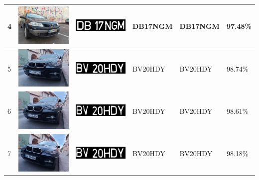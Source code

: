 \documentclass[a4paper,12pt]{report}
\begin{document}
\begin{longtable}{| m{0.6cm} | m{3cm} | m{3cm} | m{1.8cm} | m{1.8cm} | m{1.8cm} |}
    4   & \includegraphics[width=3cm,keepaspectratio]{dataset/1_s2.jpg}   & \includegraphics[width=3cm,keepaspectratio]{segmentari/4.jpg}   & DB17NGM             & DB17NGM              & 97.48\%    \\ \hline
    5   & \includegraphics[width=3cm,keepaspectratio]{dataset/2_d1.jpg}   & \includegraphics[width=3cm,keepaspectratio]{segmentari/5.jpg}   & BV20HDY             & BV20HDY              & 98.74\%    \\ \hline
    6   & \includegraphics[width=3cm,keepaspectratio]{dataset/2_d2.jpg}   & \includegraphics[width=3cm,keepaspectratio]{segmentari/6.jpg}   & BV20HDY             & BV20HDY              & 98.61\%    \\ \hline
    7   & \includegraphics[width=3cm,keepaspectratio]{dataset/2_d3.jpg}   & \includegraphics[width=3cm,keepaspectratio]{segmentari/7.jpg}   & BV20HDY             & BV20HDY              & 98.18\%    \\ \hline

\end{longtable}
\end{document}
